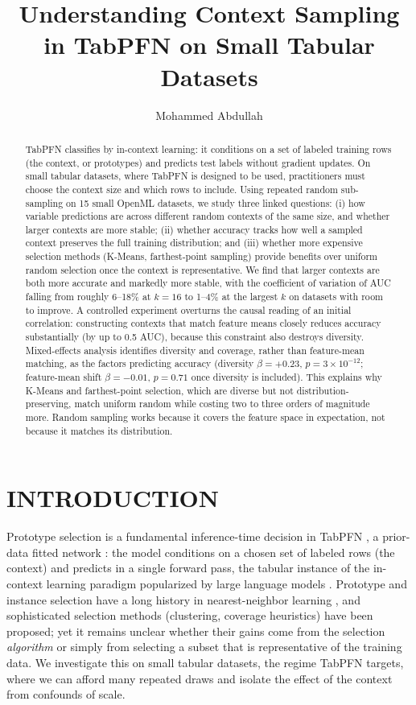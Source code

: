 \documentclass{article}
\title{Understanding Context Sampling in TabPFN on Small Tabular Datasets}
\author[1*]{Mohammed Abdullah}
\affil[1]{Department of AI \& Data Science, Anna University, Chennai, India.}
\affil[*]{Address correspondence to: mohammed.a@bigbangboom.com}
\date{}
\begin{document}
\maketitle

\begin{abstract}
TabPFN classifies by in-context learning: it conditions on a set of labeled training rows (the context, or prototypes) and predicts test labels without gradient updates. On small tabular datasets, where TabPFN is designed to be used, practitioners must choose the context size and which rows to include. Using repeated random sub-sampling on 15 small OpenML datasets, we study three linked questions: (i) how variable predictions are across different random contexts of the same size, and whether larger contexts are more stable; (ii) whether accuracy tracks how well a sampled context preserves the full training distribution; and (iii) whether more expensive selection methods (K-Means, farthest-point sampling) provide benefits over uniform random selection once the context is representative. We find that larger contexts are both more accurate and markedly more stable, with the coefficient of variation of AUC falling from roughly 6--18\% at $k=16$ to 1--4\% at the largest $k$ on datasets with room to improve. A controlled experiment overturns the causal reading of an initial correlation: constructing contexts that match feature means closely reduces accuracy substantially (by up to 0.5 AUC), because this constraint also destroys diversity. Mixed-effects analysis identifies diversity and coverage, rather than feature-mean matching, as the factors predicting accuracy (diversity $\beta=+0.23$, $p=3\times10^{-12}$; feature-mean shift $\beta=-0.01$, $p=0.71$ once diversity is included). This explains why K-Means and farthest-point selection, which are diverse but not distribution-preserving, match uniform random while costing two to three orders of magnitude more. Random sampling works because it covers the feature space in expectation, not because it matches its distribution.
\end{abstract}

\section{INTRODUCTION}

Prototype selection is a fundamental inference-time decision in TabPFN \cite{hollmann2025tabpfn}, a prior-data fitted network \cite{muller2022pfn}: the model conditions on a chosen set of labeled rows (the context) and predicts in a single forward pass, the tabular instance of the in-context learning paradigm popularized by large language models \cite{brown2020gpt3, dong2024icl}. Prototype and instance selection have a long history in nearest-neighbor learning \cite{garcia2012prototype}, and sophisticated selection methods (clustering, coverage heuristics) have been proposed; yet it remains unclear whether their gains come from the selection \emph{algorithm} or simply from selecting a subset that is representative of the training data. We investigate this on small tabular datasets, the regime TabPFN targets, where we can afford many repeated draws and isolate the effect of the context from confounds of scale.
\end{document}
